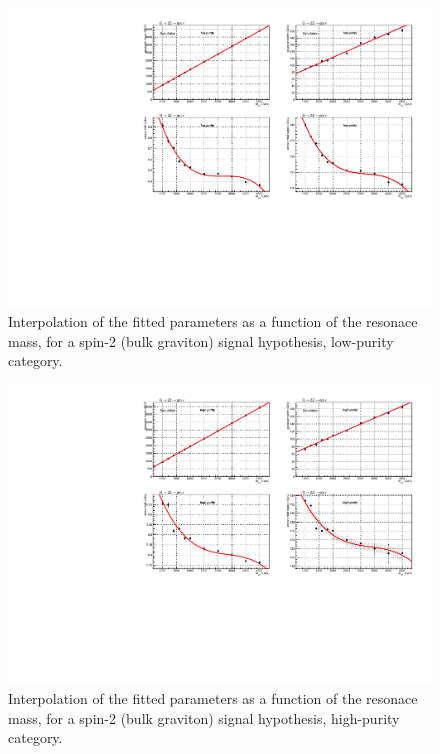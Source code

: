 \begin{figure}[!htb]
  \centering
    \includegraphics[width=.95\textwidth]{plotsAlpha_tesi/XVZnnlp/XZZInv_SignalShape.pdf}
  \caption{Interpolation of the fitted parameters as a function of the resonace mass, for a spin-2 (bulk graviton) signal hypothesis, low-purity category.}
  \label{fig:XZZ_SignalShapeLP}
\end{figure}

\begin{figure}[!htb]
  \centering
    \includegraphics[width=.95\textwidth]{plotsAlpha_tesi/XVZnnhp/XZZInv_SignalShape.pdf}

  \caption{Interpolation of the fitted parameters as a function of the resonace mass, for a spin-2 (bulk graviton) signal hypothesis, high-purity category.}
  \label{fig:XZZ_SignalShapeHP}
\end{figure}

